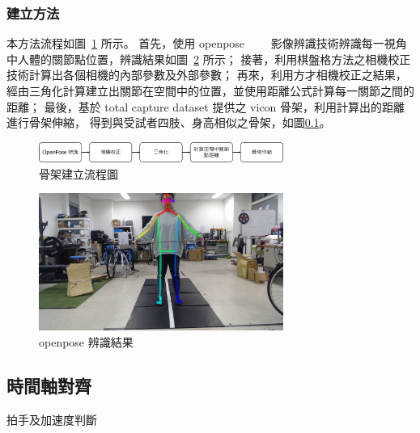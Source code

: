 \subsubsection{建立方法}
本方法流程如圖~\ref{ch3_fig_skeleton_flow} 所示。
首先，使用 openpose~\cite{8765346}~\cite{wei2016cpm}~\cite{simon2017hand}~\cite{cao2017realtime}
影像辨識技術辨識每一視角中人體的關節點位置，辨識結果如圖~\ref{ch3_fig_openpose_result} 所示；
接著，利用棋盤格方法之相機校正技術計算出各個相機的內部參數及外部參數；
再來，利用方才相機校正之結果，經由三角化計算建立出關節在空間中的位置，並使用距離公式計算每一關節之間的距離；
最後，基於 total capture dataset 提供之 vicon 骨架，利用計算出的距離進行骨架伸縮，
得到與受試者四肢、身高相似之骨架，如圖\ref{}。
\begin{figure}[!ht]
   \centering
   \includegraphics[width=8cm]{figure/ch3_fig_skeleton_flow.png}
    \caption[骨架建立流程圖]{骨架建立流程圖}
    \label{ch3_fig_skeleton_flow}
\end{figure}

\begin{figure}[!ht]
   \centering
   \includegraphics[width=8cm]{figure/ch3_fig_openpose_result.png}
    \caption[openpose 辨識結果]{openpose 辨識結果}
    \label{ch3_fig_openpose_result}
\end{figure}

\subsection{時間軸對齊}
拍手及加速度判斷

